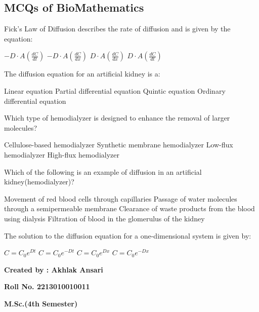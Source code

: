 \documentclass[12pt, a4paper]{exam}
\begin{document}
\begin{center}
    \section*{MCQs of BioMathematics}
\end{center}
\vspace*{1cm}
\begin{questions}
    \printanswers
    \question Fick's Law of Diffusion describes the rate of diffusion and is given by the equation:
    \begin{checkboxes}
        \choice $\displaystyle -D \cdot A \left(\frac{dC}{dt}\right)$
        \CorrectChoice $\displaystyle -D \cdot A \left(\frac{dC}{dx}\right)$
        \choice $\displaystyle D \cdot A \left(\frac{dC}{dx}\right)$
        \choice $\displaystyle D \cdot A \left(\frac{dC}{dt}\right)$
    \end{checkboxes}
    \printanswers
    \question The diffusion equation for an artificial kidney is a:
    \begin{checkboxes}
        \choice Linear equation
        \CorrectChoice Partial differential equation
        \choice Quintic equation
        \choice Ordinary differential equation
    \end{checkboxes}
    \printanswers
    \question Which type of hemodialyzer is designed to enhance the removal of larger molecules?
    \begin{checkboxes}
        \choice Cellulose-based hemodialyzer
        \choice Synthetic membrane hemodialyzer
        \choice Low-flux hemodialyzer
        \CorrectChoice  High-flux hemodialyzer
    \end{checkboxes}

    \printanswers
    \question Which of the following is an example of diffusion in an artificial kidney(hemodialyzer)?
    \begin{checkboxes}
        \choice Movement of red blood cells through capillaries
        \choice Passage of water molecules through a semipermeable membrane
        \CorrectChoice Clearance of waste products from the blood using dialysis
        \choice  Filtration of blood in the glomerulus of the kidney
    \end{checkboxes}
    \printanswers
    \question The solution to the diffusion equation for a one-dimensional system is given by:
    \begin{checkboxes}
        \choice $\displaystyle C = C_0 e^{Dt}$
        \CorrectChoice $\displaystyle C = C_0 e^{-Dt}$
        \choice $\displaystyle C = C_0 e^{Dx}$
        \choice $\displaystyle C = C_0 e^{-Dx}$
    \end{checkboxes}

\end{questions}

\vspace*{2cm}
{\bf Created by : Akhlak Ansari}

{\bf Roll No. 2213010010011}

{\bf M.Sc.(4th Semester)}
\end{document}
